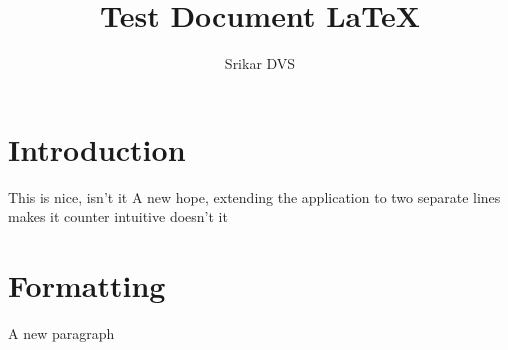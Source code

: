 \documentclass{article}
\author{Srikar DVS}
\title{Test Document {\LaTeX} }
\begin{document}
\maketitle

\section{Introduction}
This is nice, isn't it 
A new hope, extending the application to two separate lines makes it counter intuitive doesn't it
\section{Formatting}
A new paragraph 
    
\end{document}

